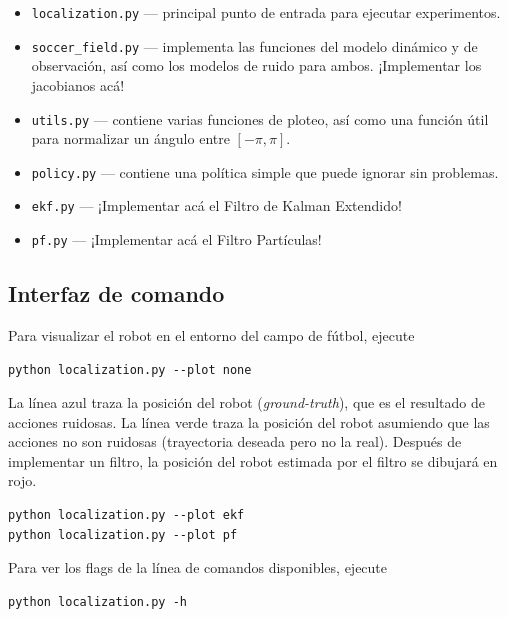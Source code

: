 \documentclass[tp]{lcc}
\begin{document}
	\begin{itemize}
		\item \lstinline[style=bash]{localization.py} --- principal punto de entrada para ejecutar experimentos.
		\item \lstinline[style=bash]{soccer_field.py} --- implementa las funciones del modelo dinámico y de observación, así como los modelos de ruido para ambos. ¡Implementar los jacobianos acá!
		\item \lstinline[style=bash]{utils.py} --- contiene varias funciones de ploteo, así como una función útil para normalizar un ángulo entre $[-\pi, \pi]$.
		\item \lstinline[style=bash]{policy.py} --- contiene una política simple que puede ignorar sin problemas.
		\item \lstinline[style=bash]{ekf.py} --- ¡Implementar acá el Filtro de Kalman Extendido!
		\item \lstinline[style=bash]{pf.py} --- ¡Implementar acá el Filtro Partículas!
	\end{itemize}

	\subsection{Interfaz de comando}

	Para visualizar el robot en el entorno del campo de fútbol, ejecute

\begin{lstlisting}[style=bash] 
python localization.py --plot none
\end{lstlisting}


	La línea {\color{blue} azul} traza la posición del robot (\emph{ground-truth}), que es el resultado de acciones ruidosas. La línea {\color{green} verde} traza la posición del robot asumiendo que las acciones no son ruidosas (trayectoria deseada pero no la real). Después de implementar un filtro, la posición del robot estimada por el filtro se dibujará en {\color{red} rojo}.
	
	
\begin{lstlisting}[style=bash] 
python localization.py --plot ekf
python localization.py --plot pf
\end{lstlisting}

	Para ver los flags de la línea de comandos disponibles, ejecute

\begin{lstlisting}[style=bash] 
python localization.py -h
\end{lstlisting}
\end{document}
